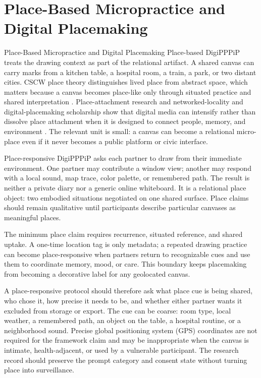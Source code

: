 \documentclass[
  ignorenonframetext,
]{beamer}
\author{\texorpdfstring{}{}}
\date{}
\begin{document}
\section{Place-Based Micropractice and Digital
Placemaking}\label{sec:place}

\begin{frame}{Place-Based Micropractice and
Digital Placemaking}
Place-based DigiPPPiP treats the drawing context as part of the
relational artifact. A shared canvas can carry marks from a kitchen
table, a hospital room, a train, a park, or two distant cities. CSCW
place theory distinguishes lived place from abstract space, which
matters because a canvas becomes place-like only through situated
practice and shared interpretation .
Place-attachment research and networked-locality and digital-placemaking
scholarship show that digital media can intensify rather than dissolve
place attachment when it is designed to connect people, memory, and
environment . The relevant unit is
small: a canvas can become a relational micro-place even if it never
becomes a public platform or civic interface.

Place-responsive DigiPPPiP asks each partner to draw from their
immediate environment. One partner may contribute a window view; another
may respond with a local sound, map trace, color palette, or remembered
path. The result is neither a private diary nor a generic online
whiteboard. It is a relational place object: two embodied situations
negotiated on one shared surface. Place claims should remain qualitative
until participants describe particular canvases as meaningful places.

The minimum place claim requires recurrence, situated reference, and
shared uptake. A one-time location tag is only metadata; a repeated
drawing practice can become place-responsive when partners return to
recognizable cues and use them to coordinate memory, mood, or care. This
boundary keeps placemaking from becoming a decorative label for any
geolocated canvas.

A place-responsive protocol should therefore ask what place cue is being
shared, who chose it, how precise it needs to be, and whether either
partner wants it excluded from storage or export. The cue can be coarse:
room type, local weather, a remembered path, an object on the table, a
hospital routine, or a neighborhood sound. Precise global positioning
system (GPS) coordinates are not required for the framework claim and
may be inappropriate when the canvas is intimate, health-adjacent, or
used by a vulnerable participant. The research record should preserve
the prompt category and consent state without turning place into
surveillance.


\end{frame}
\end{document}

